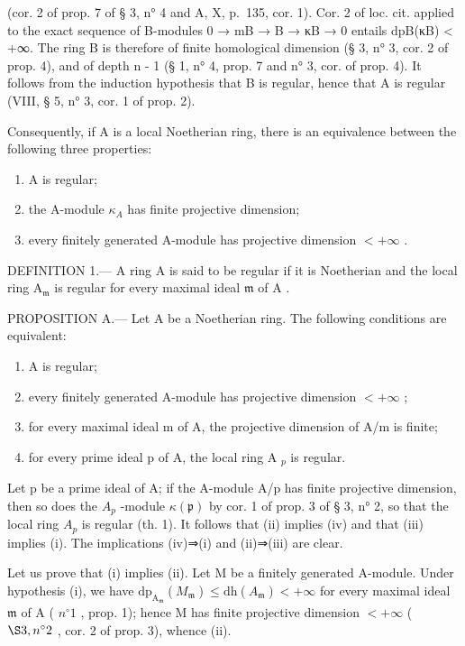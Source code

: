 (cor. 2 of prop. 7 of § 3, n° 4 and A, X, p.~135, cor. 1). Cor. 2 of loc. cit. applied to the exact sequence of B-modules 0 → mB → B → κB → 0 entails dpB(κB) \textless{} +∞. The ring B is therefore of finite homological dimension (§ 3, n° 3, cor. 2 of prop. 4), and of depth n - 1 (§ 1, n° 4, prop. 7 and n° 3, cor. of prop. 4). It follows from the induction hypothesis that B is regular, hence that A is regular (VIII, § 5, n° 3, cor. 1 of prop. 2).

Consequently, if A is a local Noetherian ring, there is an equivalence between the following three properties:

\begin{enumerate}
\def\labelenumi{(\roman{enumi})}
\item
  A is regular;
\item
  the A-module \(\kappa_{A}\) has finite projective dimension;
\item
  every finitely generated A-module has projective dimension \(<+\infty\) .
\end{enumerate}

DEFINITION 1.--- A ring A is said to be regular if it is Noetherian and the local ring \(\mathrm{A}_{\mathfrak{m}}\) is regular for every maximal ideal \(\mathfrak{m}\) of \(\mathrm{A}\) .

PROPOSITION A.--- Let A be a Noetherian ring. The following conditions are equivalent:

\begin{enumerate}
\def\labelenumi{(\roman{enumi})}
\item
  A is regular;
\item
  every finitely generated A-module has projective dimension \(< +\infty\) ;
\item
  for every maximal ideal m of A, the projective dimension of A/m is finite;
\item
  for every prime ideal p of A, the local ring A \(_{p}\) is regular.
\end{enumerate}

Let p be a prime ideal of A; if the A-module A/p has finite projective dimension, then so does the \(A_{p}\) -module \(\kappa(\mathfrak{p})\) by cor. 1 of prop. 3 of § 3, n° 2, so that the local ring \(A_{p}\) is regular (th. 1). It follows that (ii) implies (iv) and that (iii) implies (i). The implications (iv)⇒(i) and (ii)⇒(iii) are clear.

Let us prove that (i) implies (ii). Let M be a finitely generated A-module. Under hypothesis (i), we have \(\mathrm{dp}_{\mathrm{A}_{\mathfrak{m}}}(M_{\mathfrak{m}}) \leqslant \mathrm{dh}(A_{\mathfrak{m}}) < +\infty\) for every maximal ideal \(\mathfrak{m}\) of A ( \(n^{\circ} 1\) , prop. 1); hence M has finite projective dimension \(< +\infty\) ( \(\S 3, n^{\circ} 2\) , cor. 2 of prop. 3), whence (ii).


